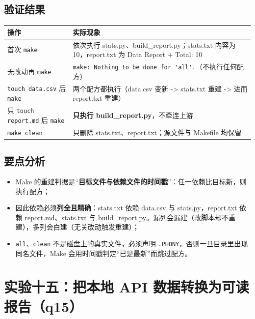 \documentclass[UTF8,fontset=ubuntu]{ctexart}
\begin{document}
\subsection{验证结果}
\begin{center}
\begin{tabular}{@{}p{5.5cm}p{9cm}@{}}
\toprule
操作 & 实际现象 \\
\midrule
首次 \lstinline|make| & 依次执行 stats.py、build\_report.py；stats.txt 内容为 10，report.txt 为 Data Report + Total: 10 \\
无改动再 \lstinline|make| & \lstinline|make: Nothing to be done for 'all'.|（不执行任何配方） \\
\lstinline|touch data.csv| 后 \lstinline|make| & 两个配方都执行（data.csv 变新 -> stats.txt 重建 -> 进而 report.txt 重建） \\
只 \lstinline|touch report.md| 后 \lstinline|make| & \textbf{只执行 build\_report.py}，不牵连上游 \\
\lstinline|make clean| & 只删除 stats.txt、report.txt；源文件与 Makefile 均保留 \\
\bottomrule
\end{tabular}
\end{center}

\subsection{要点分析}
\begin{itemize}
\item Make 的重建判据是“\textbf{目标文件与依赖文件的时间戳}”：任一依赖比目标新，则执行配方；
\item 因此依赖必须\textbf{列全且精确}：stats.txt 依赖 data.csv 与 stats.py，report.txt 依赖 report.md、stats.txt 与 build\_report.py。漏列会漏建（改脚本却不重建），多列会白建（无关改动触发重建）；
\item \lstinline|all|、\lstinline|clean| 不是磁盘上的真实文件，必须声明 \lstinline|.PHONY|，否则一旦目录里出现同名文件，Make 会用时间戳判定“已是最新”而跳过配方。
\end{itemize}

\section{实验十五：把本地 API 数据转换为可读报告（q15）}
\end{document}

